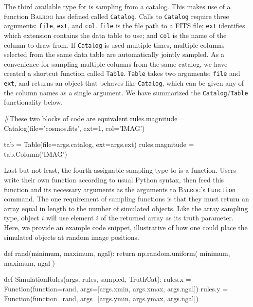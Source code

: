 \documentclass[11pt]{book}
\newcommand{\codett}[1]{\lstinline{#1}}
\newcommand{\py}{Python}
\newcommand{\balrog}{\textsc{Balrog}}
\begin{document}
The third available type for \simrules{} is sampling from a catalog. 
This makes use of a function \balrog{} has defined called \codett{Catalog}. 
Calls to \codett{Catalog} require three arguments: \codett{file}, \codett{ext}, and \codett{col}.
\codett{file} is the file path to a FITS file;
\codett{ext} identifies which extension contains the data table to use; and
\codett{col} is the name of the column to draw from.
If \codett{Catalog} is used multiple times,
multiple columns selected from the same data table are automatically jointly sampled.
As a convenience for sampling multiple columns from the same catalog, 
we have created a shortcut function called \codett{Table}.
\codett{Table} takes two arguments: \codett{file} and \codett{ext},
and returns an object that behaves like \codett{Catalog},
which can be given any of the column names as a single argument.
We have summarized the \codett{Catalog}/\codett{Table} functionality below.

\begin{code}
#These two blocks of code are equivalent
rules.magnitude = Catalog(file='cosmos.fits', ext=1, col='IMAG')

tab = Table(file=args.catalog, ext=args.ext)
rules.magnitude = tab.Column('IMAG')
\end{code}

Last but not least, the fourth assignable sampling type to \simrules{} is a function. 
Users write their own function according to usual \py{} syntax,
then feed this function and its necessary arguments as the arguments to
\balrog{}'s \codett{Function} command. 
The one requirement of sampling functions is that they must return an array equal in 
length to the number of simulated objects.
Like the array sampling type, object $i$ will use element $i$ of the returned array as its truth parameter.
Here, we provide an example code snippet, illustrative of how one could place the simulated objects at random image positions. 

\begin{code}
def rand(minimum, maximum, ngal):
    return np.random.uniform( minimum, maximum, ngal )

def SimulationRules(args, rules, sampled, TruthCat):
    rules.x = Function(function=rand, args=[args.xmin, args.xmax, args.ngal])
    rules.y = Function(function=rand, args=[args.ymin, args.ymax, args.ngal])
\end{code}
\end{document}
